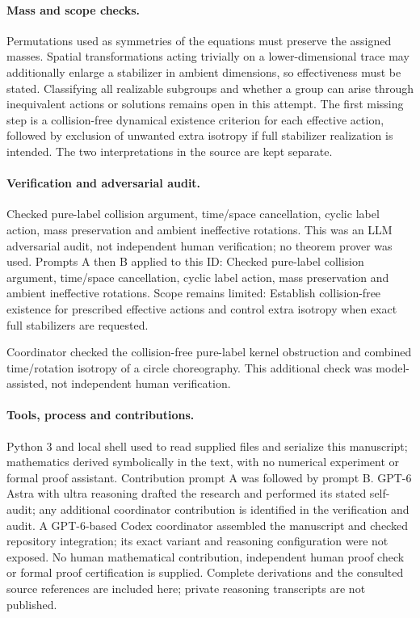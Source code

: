 \documentclass[11pt]{article}
\begin{document}
\paragraph{Mass and scope checks.}Permutations used as symmetries of the equations must preserve the assigned masses. Spatial transformations acting trivially on a lower-dimensional trace may additionally enlarge a stabilizer in ambient dimensions, so effectiveness must be stated. Classifying all realizable subgroups and whether a group can arise through inequivalent actions or solutions remains open in this attempt. The first missing step is a collision-free dynamical existence criterion for each effective action, followed by exclusion of unwanted extra isotropy if full stabilizer realization is intended. The two interpretations in the source are kept separate.

\paragraph{Verification and adversarial audit.}
Checked pure-label collision argument, time/space cancellation, cyclic label action, mass preservation and ambient ineffective rotations. This was an LLM adversarial audit, not independent human verification; no theorem prover was used. Prompts A then B applied to this ID: Checked pure-label collision argument, time/space cancellation, cyclic label action, mass preservation and ambient ineffective rotations. Scope remains limited: Establish collision-free existence for prescribed effective actions and control extra isotropy when exact full stabilizers are requested.

Coordinator checked the collision-free pure-label kernel obstruction and combined time/rotation isotropy of a circle choreography. This additional check was model-assisted, not independent human verification.

\paragraph{Tools, process and contributions.}
Python 3 and local shell used to read supplied files and serialize this manuscript; mathematics derived symbolically in the text, with no numerical experiment or formal proof assistant. Contribution prompt A was followed by prompt B. GPT-6 Astra with ultra reasoning drafted the research and performed its stated self-audit; any additional coordinator contribution is identified in the verification and audit. A GPT-6-based Codex coordinator assembled the manuscript and checked repository integration; its exact variant and reasoning configuration were not exposed. No human mathematical contribution, independent human proof check or formal proof certification is supplied. Complete derivations and the consulted source references are included here; private reasoning transcripts are not published.
\end{document}
